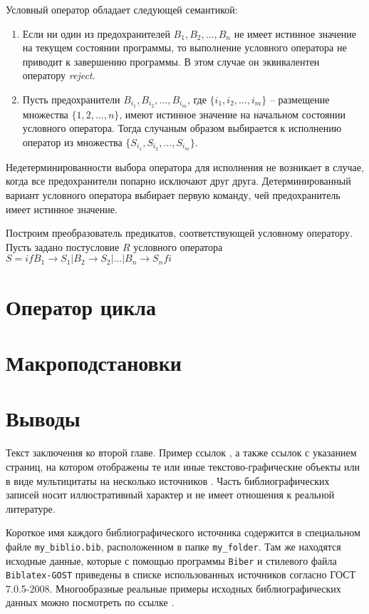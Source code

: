 Условный оператор обладает следующей семантикой:
\begin{enumerate}
	\item Если ни один из предохранителей $B_1, B_2, \ldots, B_n$ не имеет истинное значение на 
	текущем состоянии программы, то выполнение условного оператора не приводит к завершению программы.
	В этом случае он эквивалентен оператору \textit{reject}.
	\item Пусть предохранители $B_{i_1}, B_{i_2},\ldots, B_{i_m}$, где $\{i_1, i_2, \ldots, i_m\}$ -- размещение 
	множества $\{1, 2, \ldots, n\}$, имеют истинное значение на начальном состоянии условного оператора.
	Тогда случаным образом выбирается к исполнению оператор из множества $\{S_{i_1}, S_{i_2}, \ldots, S_{i_m}\}$.
\end{enumerate}
Недетерминированности выбора оператора для исполнения не возникает в случае,
когда все предохранители попарно исключают друг друга.
Детерминированный вариант условного оператора выбирает первую команду, чей предохранитель имеет истинное значение.

Построим преобразователь предикатов, соответствующей условному оператору. Пусть задано постусловие $R$ условного 
оператора $S = if B_1 \rightarrow S_1 | B_2 \rightarrow S_2 | \ldots | B_n \rightarrow S_n fi$

\section{Оператор цикла}
\section{Макроподстановки}

\section{Выводы} \label{ch2:conclusion}
Текст заключения ко второй главе. Пример ссылок \cite{Article,Book,Booklet,Conference,Inbook,Incollection,Manual,Mastersthesis,Misc,Phdthesis,Proceedings,Techreport,Unpublished,badiou:briefings}, а также ссылок с указанием страниц, на котором отображены те или иные текстово-графические объекты  \cite[с.~96]{Naidenova2017} или в виде мультицитаты на несколько источников \cites[с.~96]{Naidenova2017}[с.~46]{Ganter1999}. Часть библиографических записей носит иллюстративный характер и не имеет отношения к реальной литературе. 

Короткое имя каждого библиографического источника содержится в специальном файле \verb|my_biblio.bib|, расположенном в папке \verb|my_folder|. Там же находятся исходные данные, которые с помощью программы \texttt{Biber} и стилевого файла \texttt{Biblatex-GOST} \cite{ctan-biblatex-gost} приведены в списке использованных источников согласно ГОСТ 7.0.5-2008.
Многообразные реальные примеры исходных библиографических данных можно посмотреть по ссылке \cite{ctan-biblatex-gost-examples}.

